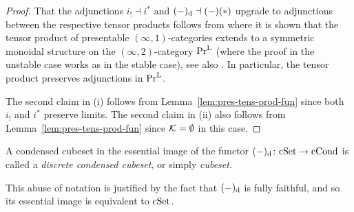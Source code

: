 \begin{proof}
That the adjunctions $i_!\dashv i^\ast$ and $(-)_{\mathrm{d}}\dashv(-)(\ast)$ upgrade to adjunctions
between the respective tensor products follows from \cite[Section I.1.6.1]{Gaitsgory2017}
where it is shown that the tensor product of presentable $(\infty,1)$-categories
extends to a symmetric monoidal structure on the $(\infty,2)$-category $\mathrm{Pr}^\mathrm{L}$
(where the proof in the unstable case works as in the stable case),
see also \cite[Section 1.2]{Haine2025}.
In particular, the tensor product preserves adjunctions in $\mathrm{Pr}^\mathrm{L}$.

The second claim in (i) follows from Lemma~\ref{lem:pres-tens-prod-fun}
since both $i_!$ and $i^\ast$ preserve limits.
The second claim in (ii) also follows from Lemma~\ref{lem:pres-tens-prod-fun} since $\mathcal{K} =\emptyset$ in this case.
\end{proof}

\begin{definition}
A condensed cubeset in the essential image of the functor $(-)_{\mathrm{d}}\colon\mathrm{cSet}\to\mathrm{cCond}$ is called a \emph{discrete condensed cubeset},
or simply \emph{cubeset}.
\end{definition}

This abuse of notation is justified by the fact that $(-)_{\mathrm{d}}$ is fully faithful,
and so its essential image is equivalent to $\mathrm{cSet}$.

